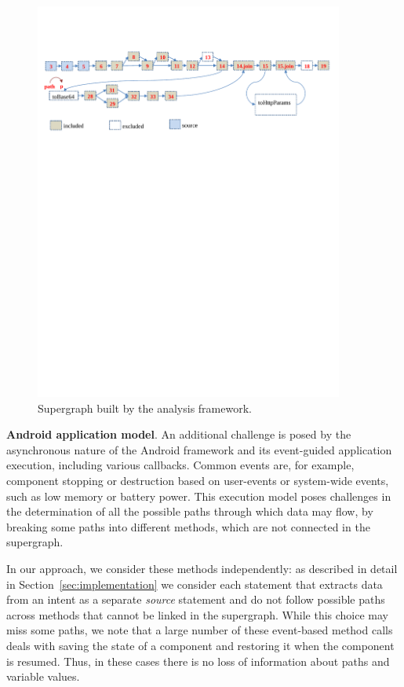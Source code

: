 \begin{figure}[t]
  \centering
    \includegraphics[width=4in]{./images/supergraph.pdf}
  \caption{Supergraph built by the analysis framework. \label{fig:supergraph}}
 \end{figure}

\noindent
\textbf{Android application model}. An additional challenge is posed by the asynchronous nature of the Android framework and its event-guided application execution, including various callbacks. Common events are, for example, component stopping or destruction based on user-events or system-wide events, such as low memory or battery power. This execution model poses challenges in the determination of all the possible paths through which data may flow, by breaking some paths into different methods, which are not connected in the supergraph.

In our approach, we consider these methods independently: as described in detail in Section~\ref{sec:implementation} we consider each statement that extracts data from an intent as a separate \textit{source} statement and do not follow possible paths across methods that cannot be linked in the supergraph. While this choice may miss some paths, we note that a large number of these event-based method calls deals with saving the state of a component and restoring it when the component is resumed. Thus, in these cases there is no loss of information about paths and variable values.

